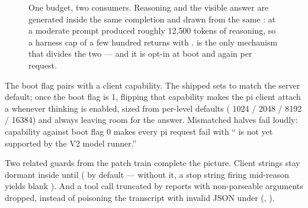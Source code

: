 \begin{figure}[htbp]
{%
}
\caption{One budget, two consumers. Reasoning and the visible answer are
generated inside the same completion and drawn from the same
: at  a moderate prompt produced
roughly 12{,}500 tokens of reasoning, so a harness cap of a few hundred
returns  with .
 is the only mechanism that divides the two ---
and it is opt-in at boot and again per request.}
\label{fig:profile-tokenbudget}
\end{figure}

\begin{hbnote}
The boot flag pairs with a client capability. The shipped
 sets
 to match the server default; once
the boot flag is 1, flipping that capability makes the pi client attach a
 whenever thinking is enabled, sized from
per-level defaults ( 1024 /  2048 / 
8192 /  16384) and always leaving room for the answer. Mismatched
halves fail loudly: capability  against boot flag 0 makes every pi
request fail with `` is not yet supported by the
V2 model runner.''
\end{hbnote}

Two related guards from the patch train complete the picture. Client
 strings stay dormant inside  until 
( by default --- without
it, a stop string firing mid-reason yields blank ). And a tool
call truncated by  reports 
with non-parseable arguments dropped, instead of poisoning the transcript
with invalid JSON under  (,
).

